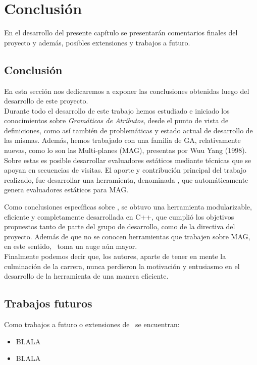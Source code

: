 \chapter{Conclusión}
\label{chap:conclusiones}

\minitoc

En el desarrollo del presente capítulo se presentarán comentarios finales del proyecto y además, posibles extensiones y trabajos a futuro.

\section{Conclusión}

En esta sección nos dedicaremos a exponer las conclusiones obtenidas luego del desarrollo de este proyecto.\\

Durante todo el desarrollo de este trabajo hemos estudiado e iniciado los conocimientos sobre \textit{Gramáticas de Atributos}, desde el punto de vista de definiciones, como así también de problemáticas y estado actual de desarrollo de las mismas. Además, hemos trabajado con una familia de GA, relativamente nuevas, como lo son las Multi-planes (MAG), presentas por Wuu Yang (1998). Sobre estas es posible desarrollar evaluadores estáticos mediante técnicas que se apoyan en secuencias de visitas. El aporte y contribución principal del trabajo realizado, fue desarrollar una herramienta, denominada \maggen, que automáticamente genera evaluadores estáticos para MAG.

Como conclusiones específicas sobre \maggen, se obtuvo una herramienta modularizable, eficiente y completamente desarrollada en C++, que cumplió los objetivos propuestos tanto de parte del grupo de desarrollo, como de la directiva del proyecto. Además de que no se conocen herramientas que trabajen sobre MAG, en este sentido, \maggen\ toma un auge aún mayor.\\

Finalmente podemos decir que, los autores, aparte de tener en mente la culminación de la carrera, nunca perdieron la motivación y entusiasmo en el desarrollo de la herramienta de una manera eficiente.

% 

\section{Trabajos futuros}
Como trabajos a futuro o extensiones de \maggen\ se encuentran:
\begin{itemize}
\item BLALA
\item BLALA
\end{itemize}